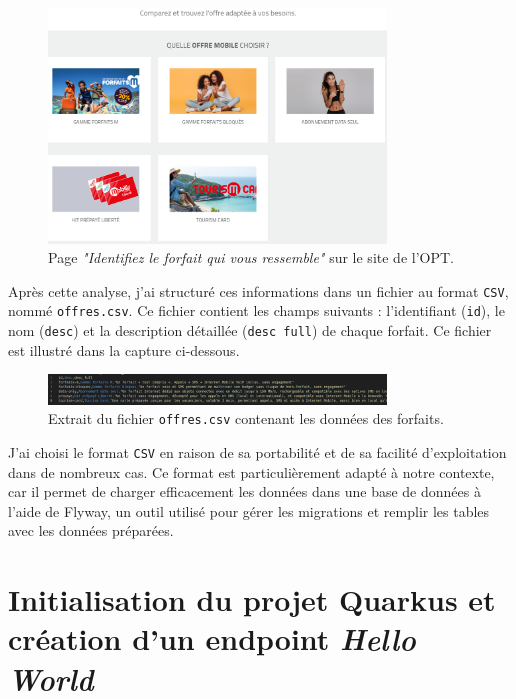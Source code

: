 \documentclass{article}
\begin{document}
	\begin{figure}[h!]
		\centering
		\includegraphics[width=0.8\textwidth]{asset/page_forfait.png}
		\caption{Page \textit{"Identifiez le forfait qui vous ressemble"} sur le site de l’OPT.}
		\label{fig:page_forfait}
	\end{figure}
	
	Après cette analyse, j’ai structuré ces informations dans un fichier au format \texttt{CSV}, nommé \texttt{offres.csv}. Ce fichier contient les champs suivants : l’identifiant (\texttt{id}), le nom (\texttt{desc}) et la description détaillée (\texttt{desc full}) de chaque forfait. Ce fichier est illustré dans la capture ci-dessous.
	
	\begin{figure}[h!]
		\centering
		\includegraphics[width=0.8\textwidth]{asset/offres_csv.png}
		\caption{Extrait du fichier \texttt{offres.csv} contenant les données des forfaits.}
		\label{fig:offres_csv}
	\end{figure}
	
	J’ai choisi le format \texttt{CSV} en raison de sa portabilité et de sa facilité d’exploitation dans de nombreux cas. Ce format est particulièrement adapté à notre contexte, car il permet de charger efficacement les données dans une base de données à l’aide de Flyway, un outil utilisé pour gérer les migrations et remplir les tables avec les données préparées.
	
	\section{Initialisation du projet Quarkus et création d’un endpoint \textit{Hello World}}
	
\end{document}

